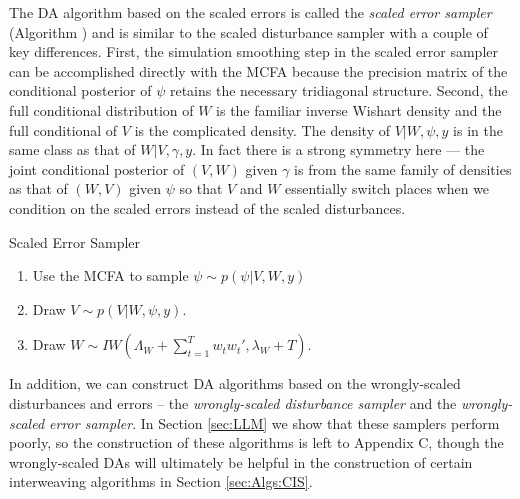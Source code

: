 \documentclass[12pt]{article}
\begin{document}
The DA algorithm based on the scaled errors is called the {\it scaled error sampler} (Algorithm ) and is similar to the scaled disturbance sampler with a couple of key differences. First, the simulation smoothing step in the scaled error sampler can be accomplished directly with the MCFA because the precision matrix of the conditional posterior of $\psi$ retains the necessary tridiagonal structure. Second, the full conditional distribution of $W$ is the familiar inverse Wishart density and the full conditional of $V$ is the complicated density. The density of $V|W,\psi,y$ is in the same class as that of $W|V,\gamma,y$. In fact there is a strong symmetry here --- the joint conditional posterior of $(V,W)$ given $\gamma$ is from the same family of densities as that of $(W,V)$ given $\psi$ so that $V$ and $W$ essentially switch places when we condition on the scaled errors instead of the scaled disturbances.
\begin{alg*}[SE]Scaled Error Sampler\label{alg:DLMerror}
\begin{enumerate}
\item Use the MCFA to sample $\psi \sim  p(\psi|V,W,y)$
\item Draw $V \sim p(V|W,\psi,y)$.
\item Draw $W \sim IW\left(\Lambda_W + \sum_{t=1}^Tw_tw_t',\lambda_{W} + T\right)$.
\end{enumerate}
\end{alg*}

In addition, we can construct DA algorithms based on the wrongly-scaled disturbances and errors -- the {\it wrongly-scaled disturbance sampler} and the {\it wrongly-scaled error sampler}. In Section \ref{sec:LLM} we show that these samplers perform poorly, so the construction of these algorithms is left to Appendix C, though the wrongly-scaled DAs will ultimately be helpful in the construction of certain interweaving algorithms in Section \ref{sec:Algs:CIS}.
\end{document}
